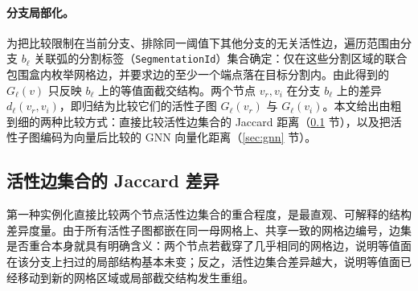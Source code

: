 \documentclass[twocolumn, a4paper, 10pt]{article}
\begin{document}
\paragraph{分支局部化。}为把比较限制在当前分支、排除同一阈值下其他分支的无关活性边，遍历范围由分支 $b_\ell$ 关联弧的分割标签（\texttt{SegmentationId}）集合确定：仅在这些分割区域的联合包围盒内枚举网格边，并要求边的至少一个端点落在目标分割内。由此得到的 $G_\ell(v)$ 只反映 $b_\ell$ 上的等值面截交结构。两个节点 $v_r,v_i$ 在分支 $b_\ell$ 上的差异 $d_\ell(v_r,v_i)$，即归结为比较它们的活性子图 $G_\ell(v_r)$ 与 $G_\ell(v_i)$。本文给出由粗到细的两种比较方式：直接比较活性边集合的 Jaccard 距离（\ref{sec:jaccard} 节），以及把活性子图编码为向量后比较的 GNN 向量化距离（\ref{sec:gnn} 节）。

\subsection{活性边集合的 Jaccard 差异}
\label{sec:jaccard}

第一种实例化直接比较两个节点活性边集合的重合程度，是最直观、可解释的结构差异度量。由于所有活性子图都嵌在同一母网格上、共享一致的网格边编号，边集是否重合本身就具有明确含义：两个节点若截穿了几乎相同的网格边，说明等值面在该分支上扫过的局部结构基本未变；反之，活性边集合差异越大，说明等值面已经移动到新的网格区域或局部截交结构发生重组。
\end{document}

